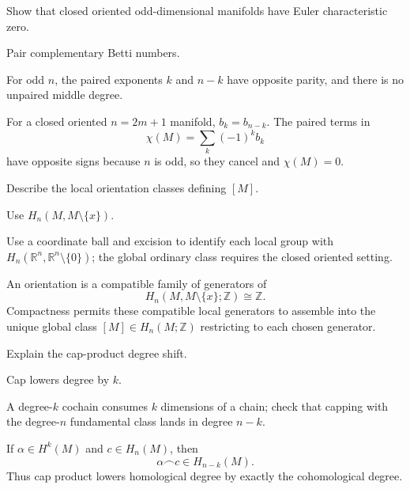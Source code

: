 \begin{exercise}\label{exr:viii33-09}
Show that closed oriented odd-dimensional manifolds have Euler characteristic zero.
\end{exercise}
\begin{hint}
Pair complementary Betti numbers.

For odd \(n\), the paired exponents \(k\) and \(n-k\) have opposite parity, and there is no unpaired middle degree.
\end{hint}
\begin{solution}
For a closed oriented \(n=2m+1\) manifold, \(b_k=b_{n-k}\). The paired terms in
\[
\chi(M)=\sum_k(-1)^k b_k
\]
have opposite signs because \(n\) is odd, so they cancel and \(\chi(M)=0\).
\end{solution}

\begin{exercise}\label{exr:viii33-10}
Describe the local orientation classes defining $[M]$.
\end{exercise}
\begin{hint}
Use $H_n(M,M\setminus\{x\})$.

Use a coordinate ball and excision to identify each local group with \(H_n(\mathbb R^n,\mathbb R^n\setminus\{0\})\); the global ordinary class requires the closed oriented setting.
\end{hint}
\begin{solution}
An orientation is a compatible family of generators of
\[
H_n(M,M\setminus\{x\};\mathbb Z)\cong\mathbb Z.
\]
Compactness permits these compatible local generators to assemble into the unique global class \([M]\in H_n(M;\mathbb Z)\) restricting to each chosen generator.
\end{solution}

\begin{exercise}\label{exr:viii33-11}
Explain the cap-product degree shift.
\end{exercise}
\begin{hint}
Cap lowers degree by $k$.

A degree-\(k\) cochain consumes \(k\) dimensions of a chain; check that capping with the degree-\(n\) fundamental class lands in degree \(n-k\).
\end{hint}
\begin{solution}
If \(\alpha\in H^k(M)\) and \(c\in H_n(M)\), then
\[
\alpha\frown c\in H_{n-k}(M).
\]
Thus cap product lowers homological degree by exactly the cohomological degree.
\end{solution}

